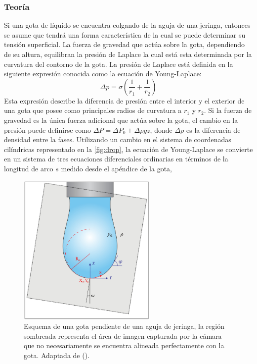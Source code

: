 \subsubsection{Teoría}
Si una gota de líquido se encuentra colgando de la aguja de una jeringa, entonces se asume que tendrá una forma característica de la cual se puede determinar su tensión superficial. La fuerza de gravedad que actúa sobre la gota, dependiendo de su altura, equilibran la presión de Laplace la cual está esta determinada por la curvatura del contorno de la gota. La presión de Laplace está definida en la siguiente expresión conocida como la ecuación de Young-Laplace:
\begin{equation}
\Delta p = \sigma \left( \frac{1}{r_{1}} + \frac{1}{r_{2}} \right)
\end{equation}
Esta expresión describe la diferencia de presión entre el interior y el exterior de una gota que posee como principales radios de curvatura a $r_{1}$ y $r_{2}$. Si la fuerza de gravedad es la única fuerza adicional que actúa sobre la gota, el cambio en la presión puede definirse como $\Delta P = \Delta P_{0}+\Delta \rho gz$, donde $\Delta \rho$ es la diferencia de densidad entre la fases. Utilizando un cambio en el sistema de coordenadas cilíndricas representado en la \autoref{fig:drop}, la ecuación de Young-Laplace se convierte en un sistema de tres ecuaciones diferenciales ordinarias en términos de la longitud de arco $s$ medido desde el apéndice de la gota,
\begin{figure}\centering
    \includegraphics[width=0.6\textwidth]{Graphics/Pendant_drop.png}
    \caption{Esquema de una gota pendiente de una aguja de jeringa, la región sombreada representa el área de imagen capturada por la cámara que no necesariamente se encuentra alineada perfectamente con la gota. Adaptada de (\cite{Berry2015}).}
    \label{fig:drop}
\end{figure}
